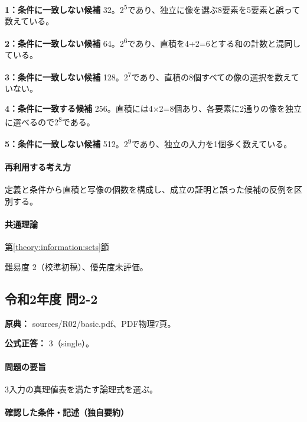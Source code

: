 \noindent\textbf{1：条件に一致しない候補} 32。2\textsuperscript{5}であり、独立に像を選ぶ8要素を5要素と誤って数えている。\par

\noindent\textbf{2：条件に一致しない候補} 64。2\textsuperscript{6}であり、直積を4+2=\allowbreak{}6とする和の計数と混同している。\par

\noindent\textbf{3：条件に一致しない候補} 128。2\textsuperscript{7}であり、直積の8個すべての像の選択を数えていない。\par

\noindent\textbf{4：条件に一致する候補} 256。直積には4×2=\allowbreak{}8個あり、各要素に2通りの像を独立に選べるので2\textsuperscript{8}である。\par

\noindent\textbf{5：条件に一致しない候補} 512。2\textsuperscript{9}であり、独立の入力を1個多く数えている。\par

\paragraph{再利用する考え方} 定義と条件から直積と写像の個数を構成し、成立の証明と誤った候補の反例を区別する。

\paragraph{共通理論} \hyperref[theory:information:sets]{第\ref*{theory:information:sets}節}

\par 難易度 2（校準初稿）、優先度未評価。

\subsection{令和2年度 問2-2}
\label{q:r02-reg-basic-2-2}

\noindent\textbf{原典：} sources/R02/basic.pdf、PDF物理7頁。

\textbf{公式正答：} 3（single）。

\paragraph{問題の要旨} 3入力の真理値表を満たす論理式を選ぶ。

\paragraph{確認した条件・記述（独自要約）}\mbox{}\par

